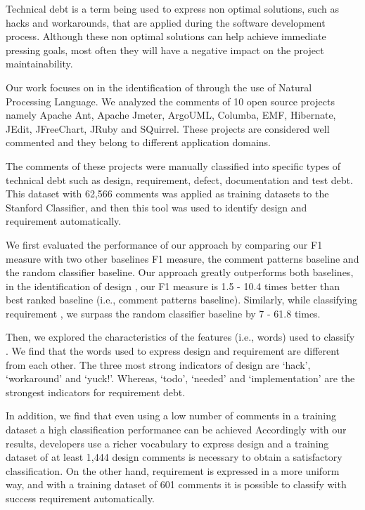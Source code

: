 Technical debt is a term being used to express non optimal solutions, such as hacks and workarounds, that are applied during the software development process. Although these non optimal solutions can help achieve immediate pressing goals, most often they will have a negative impact on the project maintainability. 

Our work focuses on in the identification of \SATD through the use of Natural Processing Language. We analyzed the comments of 10 open source projects namely Apache Ant, Apache Jmeter, ArgoUML, Columba, EMF, Hibernate, JEdit, JFreeChart, JRuby and SQuirrel. These projects are considered well commented and they belong to different application domains.

The comments of these projects were manually classified into specific types of technical debt such as design, requirement, defect, documentation and test debt. This dataset with 62,566 comments was applied as training datasets to the Stanford Classifier, and then this tool was used to identify  design and requirement \SATD automatically.

We first evaluated the performance of our approach by comparing our F1 measure with two other baselines F1 measure, the comment patterns baseline and the random classifier baseline. Our approach greatly outperforms both baselines, in the identification of design \SATD, our F1 measure is 1.5 - 10.4 times better than best ranked baseline (i.e., comment patterns baseline). Similarly, while classifying requirement \SATD, we surpass the random classifier baseline by 7 - 61.8 times.

Then, we explored the characteristics of the features (i.e., words) used to classify \SATD. We find that the words used to express design and requirement \SATD are different from each other. The three most strong indicators of design \SATD are `hack', `workaround' and `yuck!'. Whereas, `todo', `needed' and `implementation' are the strongest indicators for requirement debt.
 
In addition, we find that even using a low number of \SATD comments in a training dataset a high classification performance can be achieved Accordingly with our results, developers use a richer vocabulary to express design \SATD and a training dataset of at least 1,444 design \SATD comments is necessary to obtain a satisfactory classification. On the other hand, requirement \SATD is expressed in a more uniform way, and with a training dataset of 601 \SATD comments it is possible to classify with success requirement \SATD automatically.

